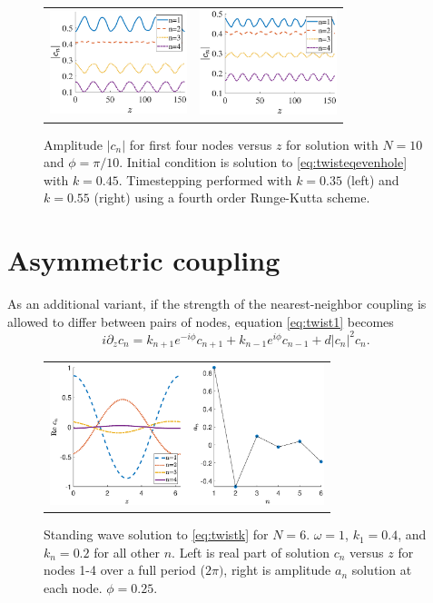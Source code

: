 \documentclass[reprint, amsmath,amssymb,aps]{revtex4-2}
\begin{document}
\begin{figure}
\begin{center}
\begin{tabular}{cc}
\includegraphics[width=4cm]{even10pertk45to35} & 
\includegraphics[width=4cm]{even10pertk45to55}
\end{tabular}
\end{center}
\caption{Amplitude $|c_n|$ for first four nodes versus $z$ for solution with $N=10$ and $\phi = \pi/10$. Initial condition is solution to \cref{eq:twisteqevenhole} with $k = 0.45$. Timestepping performed with $k = 0.35$ (left) and $k = 0.55$ (right) using a fourth order Runge-Kutta scheme.}
\label{fig:evenholekperturbed}
\end{figure}

\section{Asymmetric coupling}\label{sec:variants}

As an additional variant, if the strength of the nearest-neighbor coupling is allowed to differ between pairs of nodes, equation \cref{eq:twist1} becomes
\begin{equation}\label{eq:twistk}
i \partial_z c_n = k_{n+1} e^{-i\phi}c_{n+1} + k_{n-1} e^{i\phi}c_{n-1} + d |c_n|^2 c_n.
\end{equation}

\begin{figure}
\begin{center}
\begin{tabular}{c}
\includegraphics[width=8cm]{even6assym.eps}
\end{tabular}
\end{center}
\caption{Standing wave solution to \cref{eq:twistk} for $N = 6$. $\omega = 1$, $k_1 = 0.4$, and $k_n = 0.2$ for all other $n$. Left is real part of solution $c_n$ versus $z$ for nodes 1-4 over a full period ($2 \pi)$, right is amplitude $a_n$ solution at each node. $\phi = 0.25$.}
\label{fig:even6assym}
\end{figure}
\end{document}
